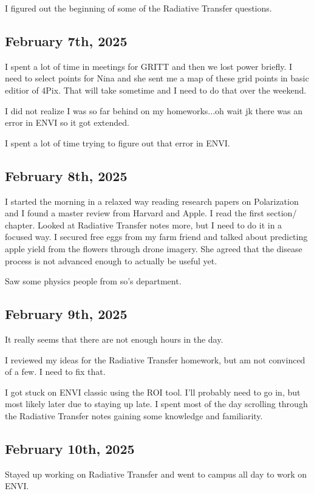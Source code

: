 \documentclass{article}
\begin{document}
I figured out the beginning of some of the Radiative Transfer questions. 


\subsection{February 7th, 2025}

I spent a lot of time in meetings for GRITT and then we lost power briefly. I need to select points for Nina and she sent me a map of these grid points in basic editior of 4Pix. That will take sometime and I need to do that over the weekend. 

I did not realize I was so far behind on my homeworks...oh wait jk there was an error in ENVI so it got extended.

I spent a lot of time trying to figure out that error in ENVI. 

\subsection{February 8th, 2025}
I started the morning in a relaxed way reading research papers on Polarization and I found a master review from Harvard and Apple. I read the first section/ chapter. 
Looked at Radiative Transfer notes more, but I need to do it in a focused way. 
I secured free eggs from my farm friend and talked about predicting apple yield from the flowers through drone imagery. She agreed that the disease process is not advanced enough to actually be useful yet.

Saw some physics people from so's department. 

\subsection{February 9th, 2025}
It really seems that there are not enough hours in the day. 

I reviewed my ideas for the Radiative Transfer homework, but am not convinced of a few. I need to fix that. 

I got stuck on ENVI classic using the ROI tool. I'll probably need to go in, but most likely later due to staying up late. 
I spent most of the day scrolling through the Radiative Transfer notes gaining some knowledge and familiarity.


\subsection{February 10th, 2025}
Stayed up working on Radiative Transfer and went to campus all day to work on ENVI. 
\end{document}
